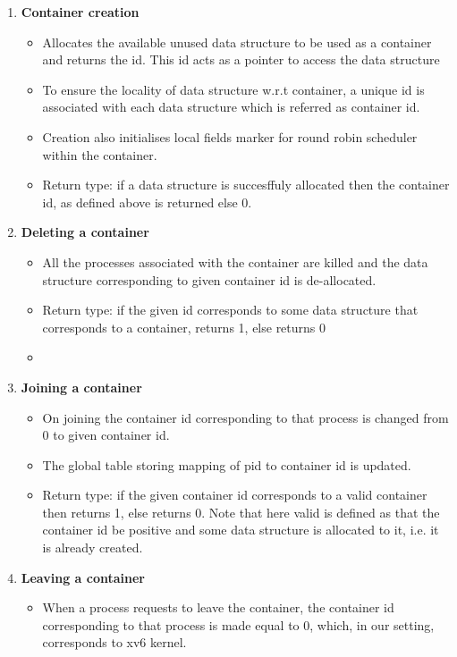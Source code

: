 \begin{enumerate}
    
    \item \textbf{Container creation}
        \begin{itemize}
            \item Allocates the available unused data structure to be used as a container and returns the id. This id acts as a pointer to access the data structure
            \item To ensure the locality of data structure w.r.t container, a unique id is associated with each data structure which is referred as container id. 
            \item Creation also initialises local fields marker for round robin scheduler within the container.
            \item Return type: if a data structure is succesffuly allocated then the container id, as defined above is returned else 0.
        \end{itemize}
        
    \item \textbf{Deleting a container}
        \begin{itemize}
            \item All the processes associated with the container are killed and the data structure corresponding to given container id is de-allocated.
            \item Return type: if the given id corresponds to some data structure that corresponds to a container, returns 1, else returns 0 
            \item 
        \end{itemize}
        
    \item \textbf{Joining a container}
        \begin{itemize}
            \item On joining the container id corresponding to that process is changed from 0 to given container id.
            \item The global table storing mapping of pid to container id is updated. 
            \item Return type: if the given container id
            corresponds to a valid container then returns 1, else returns 0. Note that here valid is defined as that the container id be positive and some data structure is allocated to it, i.e. it is already created.
        \end{itemize}
        
    \item \textbf{Leaving a container}
        \begin{itemize}
            \item When a process requests to leave the container, the container id corresponding to that process is made equal to 0, which, in our setting, corresponds to xv6 kernel. 
        \end{itemize}
        
\end{enumerate}